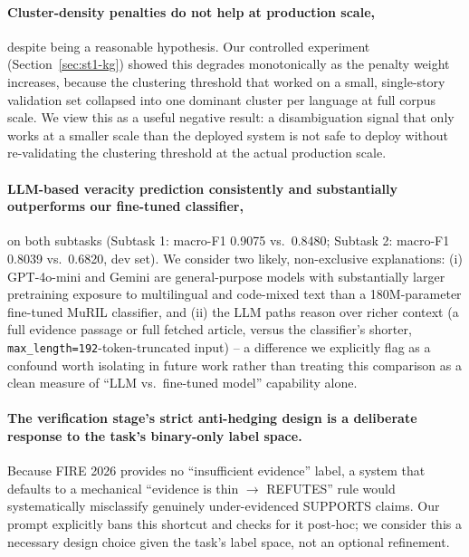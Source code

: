 \documentclass[
]{ceurart}
\begin{document}
\paragraph{Cluster-density penalties do not help at production scale,}
despite being a reasonable hypothesis. Our controlled experiment
(Section~\ref{sec:st1-kg}) showed this degrades monotonically as the
penalty weight increases, because the clustering threshold that worked
on a small, single-story validation set collapsed into one dominant
cluster per language at full corpus scale. We view this as a useful
negative result: a disambiguation signal that only works at a smaller
scale than the deployed system is not safe to deploy without
re-validating the clustering threshold at the actual production scale.

\paragraph{LLM-based veracity prediction consistently and substantially
outperforms our fine-tuned classifier,} on both subtasks (Subtask 1:
macro-F1 0.9075 vs.\ 0.8480; Subtask 2: macro-F1 0.8039 vs.\ 0.6820, dev
set). We consider two likely, non-exclusive explanations: (i)
GPT-4o-mini and Gemini are general-purpose models with substantially
larger pretraining exposure to multilingual and code-mixed text than a
180M-parameter fine-tuned MuRIL classifier, and (ii) the LLM paths
reason over richer context (a full evidence passage or full fetched
article, versus the classifier's shorter,
\texttt{max\_length=192}-token-truncated input) -- a difference we
explicitly flag as a confound worth isolating in future work rather
than treating this comparison as a clean measure of ``LLM vs.\
fine-tuned model'' capability alone.

\paragraph{The verification stage's strict anti-hedging design is a
deliberate response to the task's binary-only label space.} Because
FIRE 2026 provides no ``insufficient evidence'' label, a system that
defaults to a mechanical ``evidence is thin $\rightarrow$ REFUTES''
rule would systematically misclassify genuinely under-evidenced
SUPPORTS claims. Our prompt explicitly bans this shortcut and checks
for it post-hoc; we consider this a necessary design choice given the
task's label space, not an optional refinement.

\end{document}
